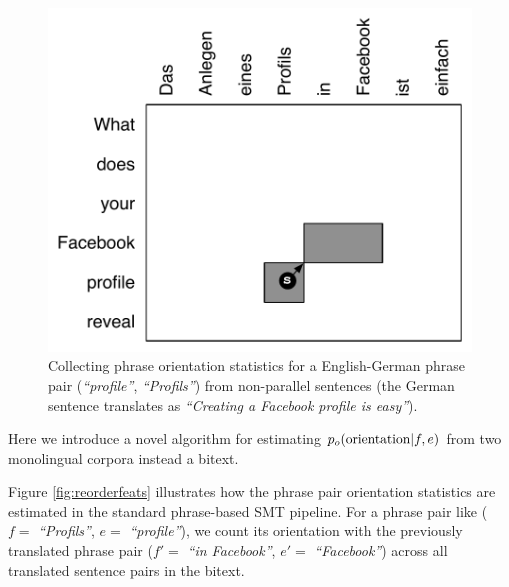 \documentclass[11pt,letterpaper]{article}
\newcommand{\emq}[1]{\emph{``#1''}}
\begin{document}
\begin{figure}[t]
\begin{center}
\includegraphics[width=0.8 \linewidth]{../figures/monoreord/monoreord.pdf}
\caption{Collecting phrase orientation statistics for a English-German phrase pair (\emq{profile}, \emq{Profils}) from non-parallel sentences (the German sentence translates as  \emq{Creating a Facebook profile is easy}). %
}
\label{fig:monoreord}
\end{center}
\vskip -0.2in
\end{figure}

Here we introduce a novel algorithm for estimating $p_o(\textnormal{orientation}|f,e)$ from two monolingual corpora instead a bitext.

Figure \ref{fig:reorderfeats} illustrates how the phrase pair orientation statistics are estimated in the standard phrase-based SMT pipeline.  For a phrase pair like ($f =$ \emq{Profils}, $e =$ \emq{profile}), we count its orientation with the previously translated phrase pair ($f' =$ \emq{in Facebook}, $e' =$ \emq{Facebook}) across all translated sentence pairs in the bitext.  
\end{document}
